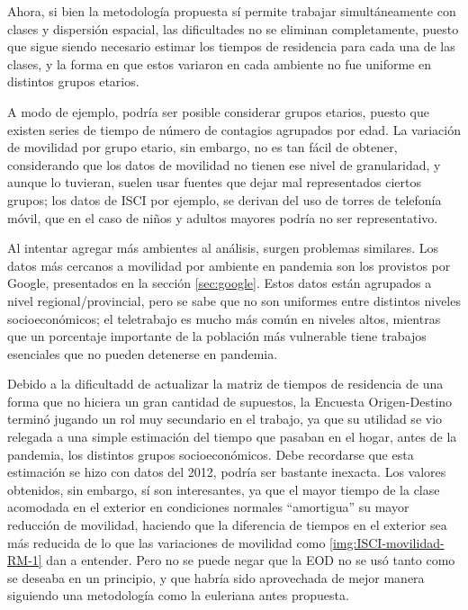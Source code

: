Ahora, si bien la metodología propuesta sí permite trabajar simultáneamente con clases y dispersión espacial, las dificultades no se eliminan completamente, puesto que sigue siendo necesario estimar los tiempos de residencia para cada una de las clases, y la forma en que estos variaron en cada ambiente no fue uniforme en distintos grupos etarios.

A modo de ejemplo, podría ser posible considerar grupos etarios, puesto que existen series de tiempo de número de contagios agrupados por edad. La variación de movilidad por grupo etario, sin embargo, no es tan fácil de obtener, considerando que los datos de movilidad no tienen ese nivel de granularidad, y aunque lo tuvieran, suelen usar fuentes que dejar mal representados ciertos grupos; los datos de ISCI por ejemplo, se derivan del uso de torres de telefonía móvil, que en el caso de niños y adultos mayores podría no ser representativo.

Al intentar agregar más ambientes al análisis, surgen problemas similares. Los datos más cercanos a movilidad por ambiente en pandemia son los provistos por Google, presentados en la sección \ref{sec:google}. Estos datos están agrupados a nivel regional/provincial, pero se sabe \cite{Olivares2020} que no son uniformes entre distintos niveles socioeconómicos; el teletrabajo es mucho más común en niveles altos, mientras que un porcentaje importante de la población más vulnerable tiene trabajos esenciales que no pueden detenerse en pandemia.

Debido a la dificultadd de actualizar la matriz de tiempos de residencia de una forma que no hiciera un gran cantidad de supuestos, la Encuesta Origen-Destino terminó jugando un rol muy secundario en el trabajo, ya que su utilidad se vio relegada a una simple estimación del tiempo que pasaban en el hogar, antes de la pandemia, los distintos grupos socioeconómicos. Debe recordarse que esta estimación se hizo con datos del 2012, podría ser bastante inexacta. Los valores obtenidos, sin embargo, sí son interesantes, ya que el mayor tiempo de la clase acomodada en el exterior en condiciones normales ``amortigua'' su mayor reducción de movilidad, haciendo que la diferencia de tiempos en el exterior sea más reducida de lo que las variaciones de movilidad como \ref{img:ISCI-movilidad-RM-1} dan a entender. Pero no se puede negar que la EOD no se usó tanto como se deseaba en un principio, y que habría sido aprovechada de mejor manera siguiendo una metodología como la euleriana antes propuesta.

